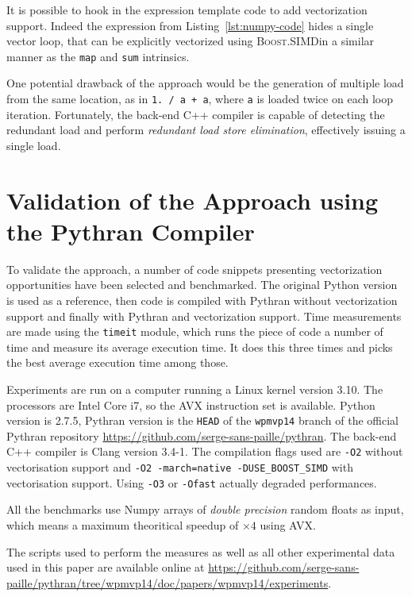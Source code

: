 \documentclass[preprint]{sigplanconf}
\providecommand{\boostsimd}{\textsc{Boost.SIMD}}
\begin{document}
It is possible to hook in the expression template code to add vectorization support.
Indeed the expression from Listing~\ref{lst:numpy-code} hides a single vector
loop, that can be explicitly vectorized using \boostsimd in a similar manner as
the \texttt{map} and \texttt{sum} intrinsics.

One potential drawback of the approach would be the generation of multiple load
from the same location, as in \texttt{1. / a + a}, where \texttt{a} is loaded
twice on each loop iteration. Fortunately, the back-end C++ compiler is capable
of detecting the redundant load and perform \emph{redundant load store
elimination}, effectively issuing a single load.

\section{Validation of the Approach using the Pythran Compiler}
\label{sec:benchs}

To validate the approach, a number of code snippets presenting vectorization
opportunities have been selected and benchmarked. The original Python version
is used as a reference, then code is compiled with Pythran without
vectorization support and finally with Pythran and vectorization support. Time
measurements are made using the \texttt{timeit} module, which runs the piece of
code a number of time and measure its average execution time. It does this
three times and picks the best average execution time among those.

Experiments are run on a computer running a Linux kernel version 3.10. The
processors are Intel Core i7, so the AVX instruction set is available. Python
version is 2.7.5, Pythran version is the \texttt{HEAD} of the \texttt{wpmvp14}
branch of the official Pythran repository
\url{https://github.com/serge-sans-paille/pythran}. The back-end C++ compiler is
Clang version 3.4-1. The compilation flags used are \texttt{-O2} without
vectorisation support and \texttt{-O2 -march=native -DUSE\_BOOST\_SIMD} with
vectorisation support. Using \texttt{-O3} or \texttt{-Ofast} actually degraded
performances.

All the benchmarks use Numpy arrays of \emph{double precision} random floats as
input, which means a maximum theoritical speedup of $\times4$ using AVX.

The scripts used to perform the measures as well as all other experimental data
used in this paper are available online at
\url{https://github.com/serge-sans-paille/pythran/tree/wpmvp14/doc/papers/wpmvp14/experiments}.
\end{document}
